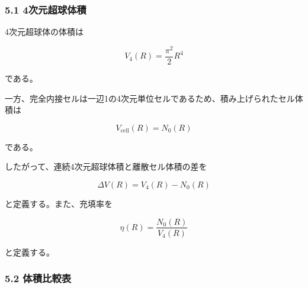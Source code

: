 \documentclass[
]{ltjsarticle}
\begin{document}
\subsubsection{5.1
4次元超球体積}\label{ux6b21ux5143ux8d85ux7403ux4f53ux7a4d}

4次元超球体の体積は

\[
V_4(R)=\frac{\pi^2}{2}R^4
\]

である。

一方、完全内接セルは一辺1の4次元単位セルであるため、積み上げられたセル体積は

\[
V_{\mathrm{cell}}(R)=N_0(R)
\]

である。

したがって、連続4次元超球体積と離散セル体積の差を

\[
\Delta V(R)=V_4(R)-N_0(R)
\]

と定義する。また、充填率を

\[
\eta(R)=\frac{N_0(R)}{V_4(R)}
\]

と定義する。

\subsubsection{5.2 体積比較表}\label{ux4f53ux7a4dux6bd4ux8f03ux8868}
\end{document}
